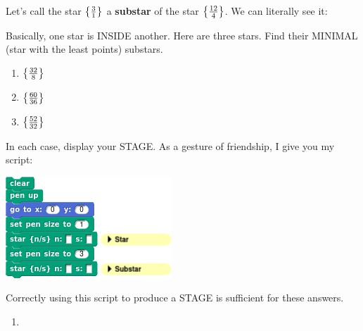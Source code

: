 \documentclass[noauthor,nooutcomes,12pt,hints,handout]{ximera}
\begin{document}
\begin{question} %
  Let's call the star $\left\{\frac{3}{1}\right\}$ a \textbf{substar} of the
  star $\left\{\frac{12}{4}\right\}$. We can literally see it:
  \begin{center}
  \end{center}
  Basically, one star is INSIDE another. Here are three stars. Find
  their MINIMAL (star with the least points) substars. 
  \begin{enumerate}
  \item $\left\{\frac{32}{8}\right\}$
  \item $\left\{\frac{60}{36}\right\}$
  \item $\left\{\frac{52}{32}\right\}$
  \end{enumerate}
  In each case, display your STAGE.  As a gesture of friendship, I give
  you my script:
  \begin{center}
    \includegraphics{substarScript.png}
  \end{center}
  Correctly using this script to produce a STAGE is sufficient for
  these answers.
  \begin{freeResponse}
    \begin{enumerate}
    \item
      \begin{center}
      \end{center}

\end{enumerate}
\end{freeResponse}
\end{question}
\end{document}
